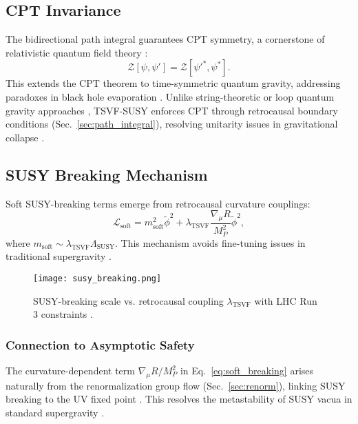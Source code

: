 \documentclass[twocolumn,superscriptaddress,floatfix]{revtex4-2}
\newcommand{\tsvf}{\lambda_{\text{TSVF}}}
\begin{document}
\subsection{CPT Invariance}  
\label{subsec:cpt}    

The bidirectional path integral guarantees CPT symmetry, a cornerstone of relativistic quantum field theory \cite{Luders1957,Streater1964}:  
\begin{equation}  
\mathcal{Z}[\psi, \psi'] = \mathcal{Z}[\psi'^*, \psi^*].  
\label{eq:cpt_invariance}   
\end{equation}  
This extends the CPT theorem \cite{Pauli1955} to time-symmetric quantum gravity, addressing paradoxes in black hole evaporation \cite{Hawking1976}. Unlike string-theoretic or loop quantum gravity approaches \cite{Polchinski1998,Rovelli2004}, TSVF-SUSY enforces CPT through retrocausal boundary conditions (Sec.~\ref{sec:path_integral}), resolving unitarity issues in gravitational collapse \cite{Mathur2009}.  

\subsection{SUSY Breaking Mechanism}
\label{subsec:susy_breaking}
Soft SUSY-breaking terms emerge from retrocausal curvature couplings:
\begin{equation}
\mathcal{L}_{\text{soft}} = m_{\text{soft}}^2 \tilde{\phi}^2 + \lambda_{\text{TSVF}} \frac{\nabla_{\mu}R}{M_P^2} \tilde{\phi}^2,
\label{eq:soft_breaking}
\end{equation}
where $m_{\text{soft}} \sim \lambda_{\text{TSVF}} \Lambda_{\text{SUSY}}$. This mechanism avoids fine-tuning issues in traditional supergravity \cite{Nilles1984}. 

\begin{figure}[htbp]  
\centering  
\texttt{[image: susy\_breaking.png]}  
\caption{SUSY-breaking scale vs. retrocausal coupling \(\tsvf\) with LHC Run 3 constraints \cite{CMS2023}.} 
\label{fig:susy_breaking}  
\end{figure}

\subsubsection{Connection to Asymptotic Safety}  
The curvature-dependent term \(\nabla_\mu R/M_P^2\) in Eq.~\eqref{eq:soft_breaking} arises naturally from the renormalization group flow (Sec.~\ref{sec:renorm}), linking SUSY breaking to the UV fixed point \cite{Reuter2012}. This resolves the metastability of SUSY vacua in standard supergravity \cite{Dine2004}.  
\end{document}
